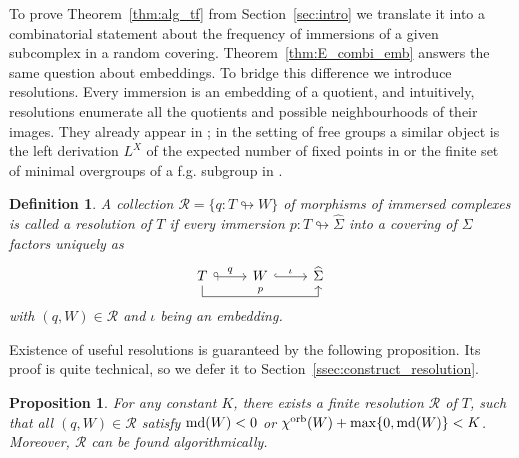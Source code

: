\documentclass{amsart}
\newtheorem{definition}[conjecture]{Definition}
\newtheorem{proposition}[conjecture]{Proposition}
\newcommand{\cho}{\chi^{\textnormal{orb}}}
\newcommand{\md}{\textnormal{md}}
\newcommand{\whS}{{\widehat{\Sigma}}}
\begin{document}
To prove Theorem~\ref{thm:alg_tf} from Section~\ref{sec:intro} we translate it into a combinatorial statement about the frequency of immersions of a given subcomplex in a random covering. Theorem~\ref{thm:E_combi_emb} answers the same question about embeddings. To bridge this difference we introduce resolutions. Every immersion is an embedding of a quotient, and intuitively, resolutions enumerate all the quotients and possible neighbourhoods of their images. They already appear in \cite[Definition 2.8]{asymptotic_stats_random_covering_surfaces_MageePuder23}; in the setting of free groups a similar object is the left derivation $L^X$ of the expected number of fixed points in \cite[Lemma 6.3]{meas_preserving_words_primitive_PuderParzanchevski15} or the finite set of minimal overgroups of a f.g. subgroup in \cite[Theorem 2]{chain_conditions_free_gps_Takahasi51}.
\begin{definition}\label{def:resolution}
A collection $\mathcal{R}=\{q\colon T\looparrowright W\}$ of morphisms of immersed complexes is called a \emph{resolution} of $T$ if every immersion $p\colon T\looparrowright\whS$ into a covering of $\Sigma$ factors uniquely as
\begin{equation*}\begin{tikzcd}
T\arrow[r,{Glyph[glyph math command=looparrowleft, swap]}->,"q"]\arrow[rr,to path={--++(0,-.5)-|(\tikztotarget)\tikztonodes},below,pos=.25,"p"]&W\arrow[r,hook,"\iota"]&\whS
\end{tikzcd}\end{equation*}
with $(q,W)\in\mathcal{R}$ and $\iota$ being an embedding.
\end{definition}
Existence of useful resolutions is guaranteed by the following proposition. Its proof is quite technical, so we defer it to Section~\ref{ssec:construct_resolution}.
\begin{proposition}\label{prop:resolution}
For any constant $K$, there exists a finite resolution $\mathcal{R}$ of $T$, such that all $(q,W)\in\mathcal{R}$ satisfy $\md(W)<0$ or $\cho(W)+\max\{0,\md(W)\}<K$. Moreover, $\mathcal{R}$ can be found algorithmically.
\end{proposition}
\end{document}

